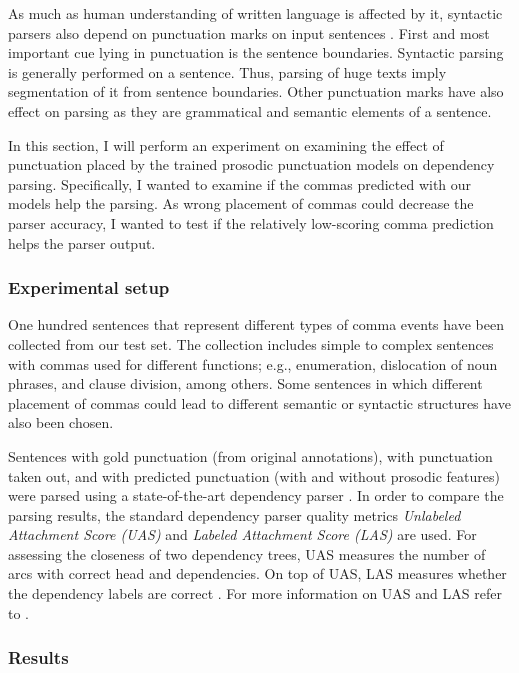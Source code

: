 As much as human understanding of written language is affected by it, syntactic parsers also depend on punctuation marks on input sentences \citep{Jones:1994:ERP:991886.991960}. First and most important cue lying in punctuation is the sentence boundaries. Syntactic parsing is generally performed on a sentence. Thus, parsing of huge texts imply segmentation of it from sentence boundaries. Other punctuation marks have also effect on parsing as they are grammatical and semantic elements of a sentence. 

In this section, I will perform an experiment on examining the effect of punctuation placed by the trained prosodic punctuation models on dependency parsing. Specifically, I wanted to examine if the commas predicted with our models help the parsing. As wrong placement of commas could decrease the parser accuracy, I wanted to test if the relatively low-scoring comma prediction helps the parser output. 

\subsubsection*{Experimental setup}

One hundred sentences that represent different types of comma events have been collected from our test set. The collection includes simple to complex sentences with commas used for different functions; e.g., enumeration, dislocation of noun phrases, and clause division, among others. Some sentences in which different placement of commas could lead to different semantic or syntactic structures have also been chosen. 

Sentences with gold punctuation (from original annotations), with punctuation taken out, and with predicted punctuation (with and without prosodic features) were parsed using a state-of-the-art dependency parser \citep{Bohnet:2012:BBW:2380816.2380828,
Bohnet:2012:TSJ:2390948.2391114}. In order to compare the parsing results, the standard dependency parser quality metrics \textit{Unlabeled Attachment Score (UAS)}  and \textit{Labeled Attachment Score (LAS)} are used. For assessing the closeness of two dependency trees, UAS measures the number of arcs with correct head and dependencies. On top of UAS, LAS measures whether the dependency labels are correct \citep{Buchholz:2006:CST:1596276.1596305}. For more information on UAS and LAS refer to \cite{Nivre2017UniversalDE, green:dependency}.

\subsubsection*{Results}

